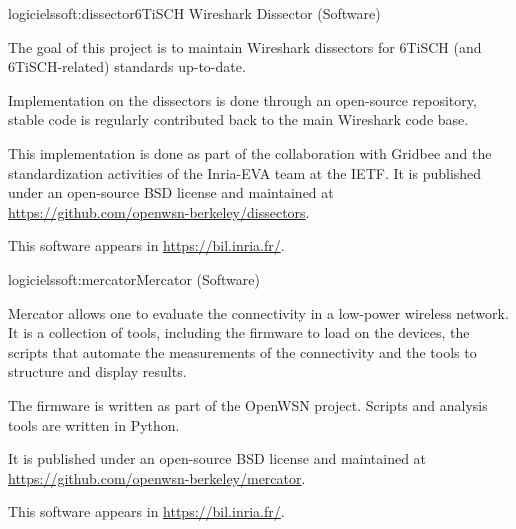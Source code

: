 \documentclass{ra2016}
\begin{document}
\begin{module}{logiciels}{soft:dissector}{6TiSCH Wireshark Dissector (Software)}

\begin{participants}
\end{participants}

The goal of this project is to maintain Wireshark dissectors for 6TiSCH (and 6TiSCH-related) standards up-to-date.

Implementation on the dissectors is done through an open-source repository, stable code is regularly contributed back to the main Wireshark code base.

This implementation is done as part of the collaboration with Gridbee and the standardization activities of the Inria-EVA team at the IETF.
It is published under an open-source BSD license and maintained at \url{https://github.com/openwsn-berkeley/dissectors}.

This software appears in \url{https://bil.inria.fr/}.

\end{module}

\begin{module}{logiciels}{soft:mercator}{Mercator (Software)}

\begin{participants}
\end{participants}

Mercator allows one to evaluate the connectivity in a low-power wireless network.
It is a collection of tools, including the firmware to load on the devices, the scripts that automate the measurements of the connectivity and the tools to structure and display results.

The firmware is written as part of the OpenWSN project.
Scripts and analysis tools are written in Python.

It is published under an open-source BSD license and maintained at \url{https://github.com/openwsn-berkeley/mercator}.

This software appears in \url{https://bil.inria.fr/}.

\end{module}
\end{document}

